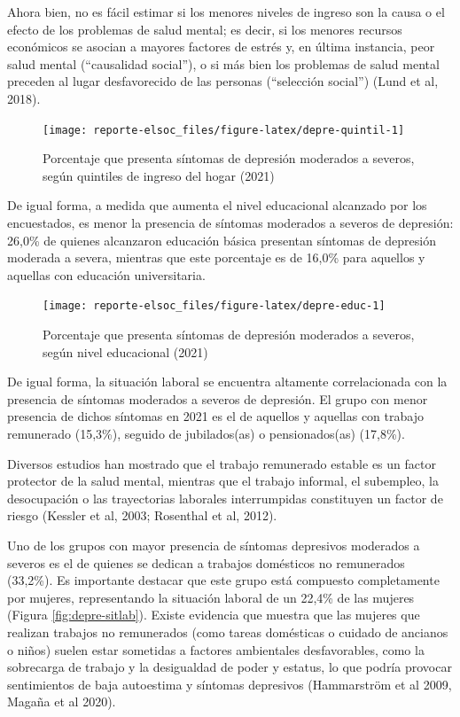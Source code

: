 \documentclass[
  12pt,
]{book}
\begin{document}
Ahora bien, no es fácil estimar si los menores niveles de ingreso son la causa o el efecto de los problemas de salud mental; es decir, si los menores recursos económicos se asocian a mayores factores de estrés y, en última instancia, peor salud mental (``causalidad social''), o si más bien los problemas de salud mental preceden al lugar desfavorecido de las personas (``selección social'') (Lund et al, 2018).

\begin{figure}

{\centering \texttt{[image: reporte-elsoc\_files/figure-latex/depre-quintil-1]} 

}

\caption{Porcentaje que presenta síntomas de depresión moderados a severos, según quintiles de ingreso del hogar (2021)}\label{fig:depre-quintil}
\end{figure}

De igual forma, a medida que aumenta el nivel educacional alcanzado por los encuestados, es menor la presencia de síntomas moderados a severos de depresión: 26,0\% de quienes alcanzaron educación básica presentan síntomas de depresión moderada a severa, mientras que este porcentaje es de 16,0\% para aquellos y aquellas con educación universitaria.

\begin{figure}

{\centering \texttt{[image: reporte-elsoc\_files/figure-latex/depre-educ-1]} 

}

\caption{Porcentaje que presenta síntomas de depresión moderados a severos, según nivel educacional (2021)}\label{fig:depre-educ}
\end{figure}

De igual forma, la situación laboral se encuentra altamente correlacionada con la presencia de síntomas moderados a severos de depresión. El grupo con menor presencia de dichos síntomas en 2021 es el de aquellos y aquellas con trabajo remunerado (15,3\%), seguido de jubilados(as) o pensionados(as) (17,8\%).

Diversos estudios han mostrado que el trabajo remunerado estable es un factor protector de la salud mental, mientras que el trabajo informal, el subempleo, la desocupación o las trayectorias laborales interrumpidas constituyen un factor de riesgo (Kessler et al, 2003; Rosenthal et al, 2012).

Uno de los grupos con mayor presencia de síntomas depresivos moderados a severos es el de quienes se dedican a trabajos domésticos no remunerados (33,2\%). Es importante destacar que este grupo está compuesto completamente por mujeres, representando la situación laboral de un 22,4\% de las mujeres (Figura \ref{fig:depre-sitlab}). Existe evidencia que muestra que las mujeres que realizan trabajos no remunerados (como tareas domésticas o cuidado de ancianos o niños) suelen estar sometidas a factores ambientales desfavorables, como la sobrecarga de trabajo y la desigualdad de poder y estatus, lo que podría provocar sentimientos de baja autoestima y síntomas depresivos (Hammarström et al 2009, Magaña et al 2020).
\end{document}
